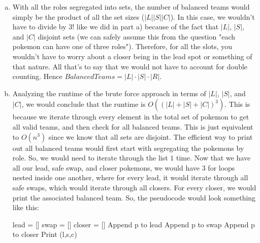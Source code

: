 \documentclass[letterpaper,11pt]{article}
\theoremstyle{plain}
\theoremstyle{definition}
\begin{document}
{\begin{enumerate}[a)]
    \item 
    With all the roles segregated into sets, the number of balanced teams would simply be the product of all the set sizes ($|L||S||C|$). In this case, we wouldn't have to divide by $3!$ like we did in part a) because of the fact that $|L|$, $|S|$, and $|C|$ disjoint sets (we can safely assume this from the question "each pokemon can have one of three roles"). Therefore, for all the slots, you wouldn't have to worry about a closer being in the lead spot or something of that nature. All that's to say that we would not have to account for double counting. 
    Hence $Balanced Teams = |L| \cdot |S| \cdot |R|$.
    \item
    Analyzing the runtime of the brute force approach in terms of $|L|$, $|S|$, and $|C|$, we would conclude that the runtime is $O((|L| + |S| + |C|)^3)$. This is because we iterate through every element in the total set of pokemon to get all valid teams, and then check for all balanced teams. This is just equivalent to $O(n^3)$ since we know that all sets are disjoint.
    The efficient way to print out all balanced teams would first start with segregating the pokemons by role. So, we would need to iterate through the list $1$ time. Now that we have all our lead, safe swap, and closer pokemons, we would have $3$ for loops nested inside one another, where for every lead, it would iterate through all safe swaps, which would iterate through all closers. For every closer, we would print the associated balanced team. So, the pseudocode would look something like this:
    \begin{algorithm}[H]
    \caption{Efficient Balanced Teams}\label{alg:cap}
    \begin{algorithmic}[1] %
        \State lead = []
        \State swap = []
        \State closer = []
                \State Append p to lead
                \State Append p to swap
            \Else
                \State Append p to closer
            \EndIf
        \EndFor
                    \State Print (l,s,c)
                \EndFor
            \EndFor
        \EndFor
    \EndProcedure
    \end{algorithmic}
    \end{algorithm}

\end{enumerate}}
\end{document}
